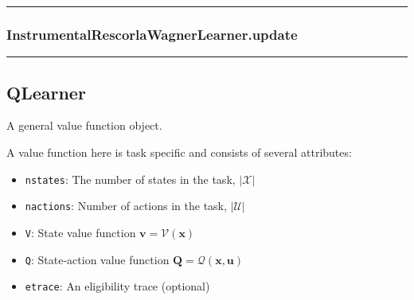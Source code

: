 \begin{center}\rule{0.5\linewidth}{\linethickness}\end{center}

\hypertarget{instrumentalrescorlawagnerlearner.update}{%
\subsubsection{InstrumentalRescorlaWagnerLearner.update}\label{instrumentalrescorlawagnerlearner.update}}

\begin{Shaded}
\begin{Highlighting}[]
\end{Highlighting}
\end{Shaded}

\begin{center}\rule{0.5\linewidth}{\linethickness}\end{center}

\hypertarget{qlearner}{%
\subsection{QLearner}\label{qlearner}}

\begin{Shaded}
\begin{Highlighting}[]
\end{Highlighting}
\end{Shaded}

A general value function object.

A value function here is task specific and consists of several
attributes:

\begin{itemize}
\tightlist
\item
  \texttt{nstates}: The number of states in the task, \(|\mathcal X|\)
\item
  \texttt{nactions}: Number of actions in the task, \(|\mathcal U|\)
\item
  \texttt{V}: State value function \(\mathbf v = \mathcal V(\mathbf x)\)
\item
  \texttt{Q}: State-action value function
  \(\mathbf Q = \mathcal Q(\mathbf x, \mathbf u)\)
\item
  \texttt{etrace}: An eligibility trace (optional)
\end{itemize}

